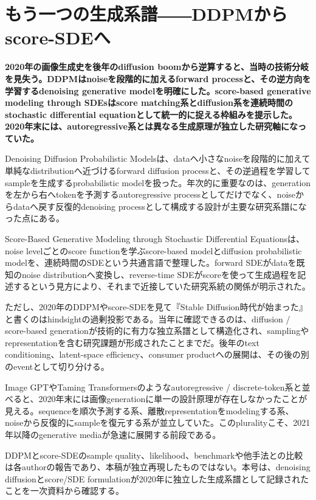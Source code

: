\section{もう一つの生成系譜――DDPMからscore-SDEへ}
\noindent\textbf{2020年の画像生成史を後年のdiffusion boomから逆算すると、当時の技術分岐を見失う。DDPMはnoiseを段階的に加えるforward processと、その逆方向を学習するdenoising generative modelを明確にした。score-based generative modeling through SDEsはscore matching系とdiffusion系を連続時間のstochastic differential equationとして統一的に捉える枠組みを提示した。2020年末には、autoregressive系とは異なる生成原理が独立した研究軸になっていた。}\autocite{src-c012a248ff78,src-d6e451e5085e}

Denoising Diffusion Probabilistic Modelsは、dataへ小さなnoiseを段階的に加えて単純なdistributionへ近づけるforward diffusion processと、その逆過程を学習してsampleを生成するprobabilistic modelを扱った。年次的に重要なのは、generationを左から右へtokenを予測するautoregressive processとしてだけでなく、noiseからdataへ戻す反復的denoising processとして構成する設計が主要な研究系譜になった点にある。\autocite{src-d6e451e5085e}


Score-Based Generative Modeling through Stochastic Differential Equationsは、noise levelごとのscore functionを学ぶscore-based modelとdiffusion probabilistic modelを、連続時間のSDEという共通言語で整理した。forward SDEがdataを既知のnoise distributionへ変換し、reverse-time SDEがscoreを使って生成過程を記述するという見方により、それまで近接していた研究系統の関係が明示された。\autocite{src-c012a248ff78}


ただし、2020年のDDPMやscore-SDEを見て『Stable Diffusion時代が始まった』と書くのはhindsightの過剰投影である。当年に確認できるのは、diffusion / score-based generationが技術的に有力な独立系譜として構造化され、samplingやrepresentationを含む研究課題が形成されたことまでだ。後年のtext conditioning、latent-space efficiency、consumer productへの展開は、その後の別のeventとして切り分ける。\autocite{src-c012a248ff78,src-d6e451e5085e}


Image GPTやTaming Transformersのようなautoregressive / discrete-token系と並べると、2020年末には画像generationに単一の設計原理が存在しなかったことが見える。sequenceを順次予測する系、離散representationをmodelingする系、noiseから反復的にsampleを復元する系が並立していた。このpluralityこそ、2021年以降のgenerative mediaが急速に展開する前段である。\autocite{src-c012a248ff78,src-d6e451e5085e}


\begin{claimboundary}
DDPMとscore-SDEのsample quality、likelihood、benchmarkや他手法との比較は各authorの報告であり、本稿が独立再現したものではない。本号は、denoising diffusionとscore/SDE formulationが2020年に独立した生成系譜として記録されたことを一次資料から確認する。\autocite{src-c012a248ff78,src-d6e451e5085e}
\end{claimboundary}
